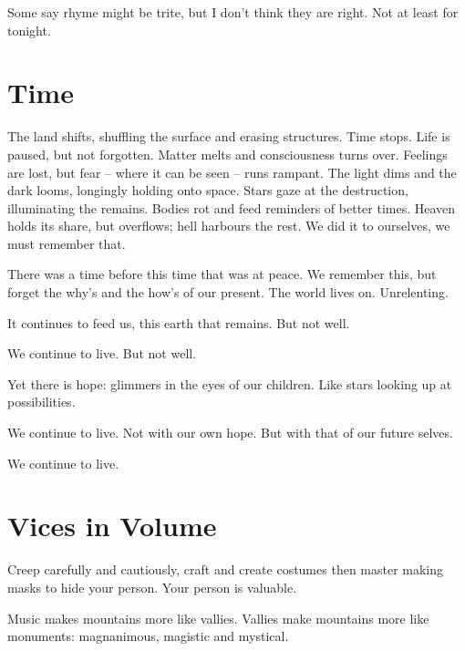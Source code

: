 \documentclass[fontsize=12pt,english]{scrreprt}
\begin{document}
Some say rhyme might be trite, but I don’t think they are right. Not
at least for tonight.

\newpage

\section{Time}


The land shifts, shuffling the surface and erasing structures. Time
stops. Life is paused, but not forgotten. Matter melts and
consciousness turns over. Feelings are lost, but fear -- where it can
be seen -- runs rampant. The light dims and the dark looms, longingly
holding onto space. Stars gaze at the destruction, illuminating the
remains. Bodies rot and feed reminders of better times. Heaven holds
its share, but overflows; hell harbours the rest. We did it to
ourselves, we must remember that.

There was a time before this time that was at peace. We remember this,
but forget the why's and the how's of our present. The world lives
on. Unrelenting.

It continues to feed us, this earth that remains. But not well.

We continue to live. But not well.

Yet there is hope: glimmers in the eyes of our children. Like stars
looking up at possibilities.

We continue to live. Not with our own hope. But with that of our
future selves.

We continue to live.

\newpage

\section{Vices in Volume}


Creep carefully and cautiously, craft and create costumes then master
making masks to hide your person. Your person is valuable.



Music makes mountains more like vallies. Vallies make mountains more
like monuments: magnanimous, magistic and mystical.
\end{document}
